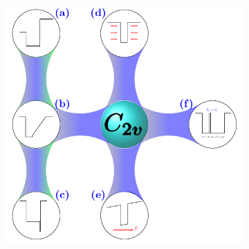 \begin{figure}[ht!]
	\centering
	\begin{subfigure}{\textwidth}
		\includegraphics[width=\textwidth]{../figures/chapter-2/symmetry/out/roadmap}
		\label{subfig:subsubsec:chapter-2-roadmap-a}
		\label{subfig:subsubsec:chapter-2-roadmap-b}
		\label{subfig:subsubsec:chapter-2-roadmap-c}
		\label{subfig:subsubsec:chapter-2-roadmap-d}
		\label{subfig:subsubsec:chapter-2-roadmap-e}
		\label{subfig:subsubsec:chapter-2-roadmap-f}
	\end{subfigure}
	\caption
	{
}
\end{figure}
